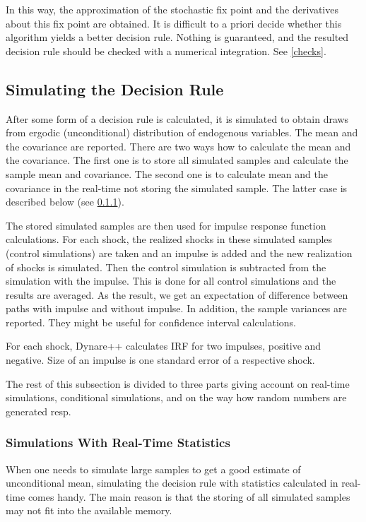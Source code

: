 \documentclass[10pt]{article}
\begin{document}
In this way, the approximation of the stochastic fix point and the
derivatives about this fix point are obtained. It is difficult to a
priori decide whether this algorithm yields a better decision
rule. Nothing is guaranteed, and the resulted decision rule should be
checked with a numerical integration. See \ref{checks}.

\subsection{Simulating the Decision Rule}

After some form of a decision rule is calculated, it is simulated to
obtain draws from ergodic (unconditional) distribution of endogenous
variables. The mean and the covariance are reported. There are two
ways how to calculate the mean and the covariance. The first one is to
store all simulated samples and calculate the sample mean and
covariance. The second one is to calculate mean and the covariance in
the real-time not storing the simulated sample. The latter case is
described below (see \ref{rt_simul}).

The stored simulated samples are then used for impulse response
function calculations. For each shock, the realized shocks in these
simulated samples (control simulations) are taken and an impulse is
added and the new realization of shocks is simulated. Then the control
simulation is subtracted from the simulation with the impulse. This is
done for all control simulations and the results are averaged. As the
result, we get an expectation of difference between paths with impulse
and without impulse. In addition, the sample variances are
reported. They might be useful for confidence interval calculations.

For each shock, Dynare++ calculates IRF for two impulses, positive and
negative. Size of an impulse is one standard error of a respective
shock.

The rest of this subsection is divided to three parts giving account
on real-time simulations, conditional simulations, and on the way how
random numbers are generated resp.

\subsubsection{Simulations With Real-Time Statistics}
\label{rt_simul}

When one needs to simulate large samples to get a good estimate of
unconditional mean, simulating the decision rule with statistics
calculated in real-time comes handy. The main reason is that the
storing of all simulated samples may not fit into the available
memory.
\end{document}
